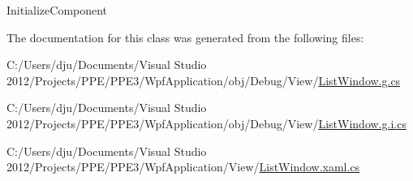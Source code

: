Initialize\-Component 



The documentation for this class was generated from the following files\-:\begin{DoxyCompactItemize}
\item 
C\-:/\-Users/dju/\-Documents/\-Visual Studio 2012/\-Projects/\-P\-P\-E/\-P\-P\-E3/\-Wpf\-Application/obj/\-Debug/\-View/\hyperlink{_list_window_8g_8cs}{List\-Window.\-g.\-cs}\item 
C\-:/\-Users/dju/\-Documents/\-Visual Studio 2012/\-Projects/\-P\-P\-E/\-P\-P\-E3/\-Wpf\-Application/obj/\-Debug/\-View/\hyperlink{_list_window_8g_8i_8cs}{List\-Window.\-g.\-i.\-cs}\item 
C\-:/\-Users/dju/\-Documents/\-Visual Studio 2012/\-Projects/\-P\-P\-E/\-P\-P\-E3/\-Wpf\-Application/\-View/\hyperlink{_list_window_8xaml_8cs}{List\-Window.\-xaml.\-cs}\end{DoxyCompactItemize}
